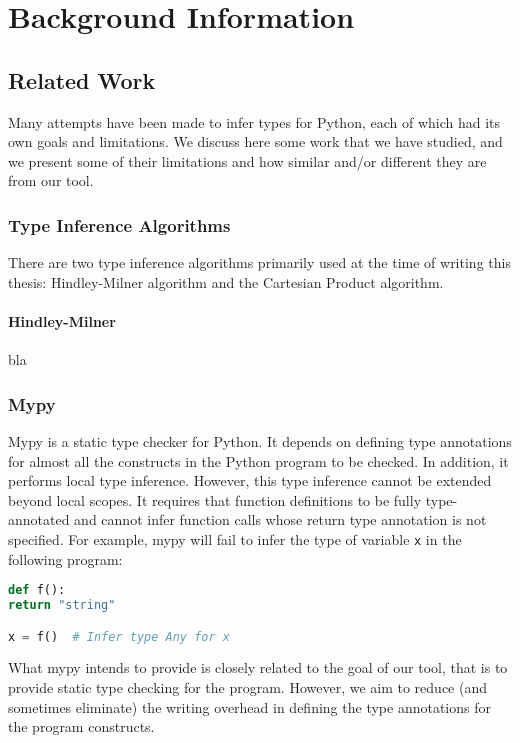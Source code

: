 
\chapter{Background Information}\label{chapter:background}

\section{Related Work}
Many attempts have been made to infer types for Python, each of which had its own goals and limitations. We discuss here some work that we have studied, and we present some of their limitations and how similar and/or different they are from our tool.

\subsection{Type Inference Algorithms}
There are two type inference algorithms primarily used at the time of writing this thesis: Hindley-Milner algorithm and the Cartesian Product algorithm.

\subsubsection{Hindley-Milner}
bla


\subsection{Mypy \cite{mypy}}
Mypy is a static type checker for Python. It depends on defining type annotations for almost all the constructs in the Python program to be checked. In addition, it performs local type inference. However, this type inference cannot be extended beyond local scopes. It requires that function definitions to be fully type-annotated and cannot infer function calls whose return type annotation is not specified. For example, mypy will fail to infer the type of variable \lstinline|x| in the following program:

\begin{lstlisting}[language=Python]
def f():
return "string"

x = f()  # Infer type Any for x
\end{lstlisting}

What mypy intends to provide is closely related to the goal of our tool, that is to provide static type checking for the program. However, we aim to reduce (and sometimes eliminate) the writing overhead in defining the type annotations for the program constructs.


